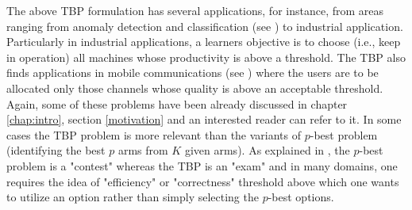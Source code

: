 The above TBP formulation has several applications, for instance, from areas ranging from anomaly detection and classification (see  \citet{locatelli2016optimal}) to industrial application. Particularly in industrial applications, a learners objective is to choose (i.e., keep in operation) all machines whose productivity is above a threshold. The TBP also finds applications in mobile communications (see \citet{audibert2010best})  where the users are to be allocated only those channels whose quality is above an acceptable threshold. Again, some of these problems have been already discussed in chapter \ref{chap:intro}, section \ref{motivation} and an interested reader can refer to it. In some cases the TBP problem is more relevant than the variants of $p$-best problem (identifying the best $p$ arms from $K$ given arms). As explained in \citet{locatelli2016optimal}, the $p$-best problem is a "contest" whereas the TBP is an  "exam" and in many domains, one requires the idea of "efficiency" or "correctness" threshold above which one wants to utilize an option rather than simply selecting the $p$-best options.


%
%
%
%
%